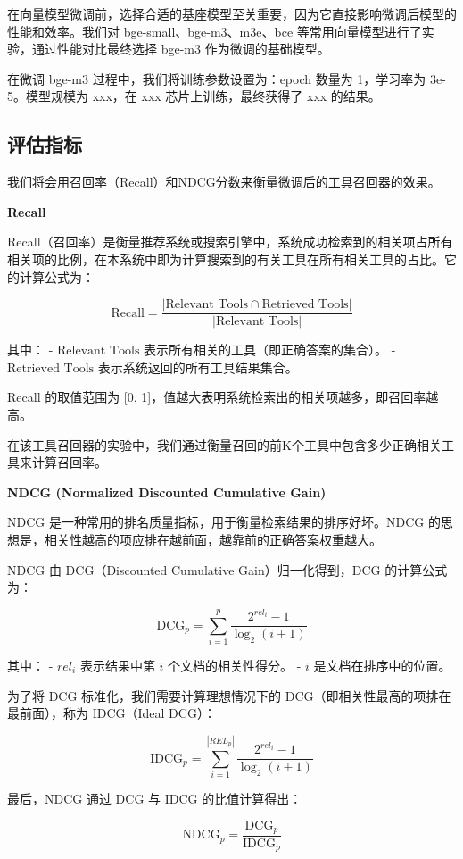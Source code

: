 在向量模型微调前，选择合适的基座模型至关重要，因为它直接影响微调后模型的性能和效率。我们对 bge-small、bge-m3、m3e、bce 等常用向量模型进行了实验，通过性能对比最终选择 bge-m3 作为微调的基础模型。

在微调 bge-m3 过程中，我们将训练参数设置为：epoch 数量为 1，学习率为 3e-5。模型规模为 xxx，在 xxx 芯片上训练，最终获得了 xxx 的结果。


\subsection{评估指标}

我们将会用召回率（Recall）和NDCG分数来衡量微调后的工具召回器的效果。

\textbf{Recall}

Recall（召回率）是衡量推荐系统或搜索引擎中，系统成功检索到的相关项占所有相关项的比例，在本系统中即为计算搜索到的有关工具在所有相关工具的占比。它的计算公式为：

\[
\text{Recall} = \frac{|\text{Relevant Tools} \cap \text{Retrieved Tools}|}{|\text{Relevant Tools}|}
\]

其中：
- \(\text{Relevant Tools}\) 表示所有相关的工具（即正确答案的集合）。
- \(\text{Retrieved Tools}\) 表示系统返回的所有工具结果集合。

Recall 的取值范围为 [0, 1]，值越大表明系统检索出的相关项越多，即召回率越高。

在该工具召回器的实验中，我们通过衡量召回的前K个工具中包含多少正确相关工具来计算召回率。

\textbf{NDCG (Normalized Discounted Cumulative Gain)}

NDCG 是一种常用的排名质量指标，用于衡量检索结果的排序好坏。NDCG 的思想是，相关性越高的项应排在越前面，越靠前的正确答案权重越大。

NDCG 由 DCG（Discounted Cumulative Gain）归一化得到，DCG 的计算公式为：

\[
\text{DCG}_p = \sum_{i=1}^{p} \frac{2^{rel_i} - 1}{\log_2(i + 1)}
\]

其中：
- \(rel_i\) 表示结果中第 \(i\) 个文档的相关性得分。
- \(i\) 是文档在排序中的位置。

为了将 DCG 标准化，我们需要计算理想情况下的 DCG（即相关性最高的项排在最前面），称为 IDCG（Ideal DCG）：

\[
\text{IDCG}_p = \sum_{i=1}^{|REL_p|} \frac{2^{rel_i} - 1}{\log_2(i + 1)}
\]

最后，NDCG 通过 DCG 与 IDCG 的比值计算得出：

\[
\text{NDCG}_p = \frac{\text{DCG}_p}{\text{IDCG}_p}
\]

